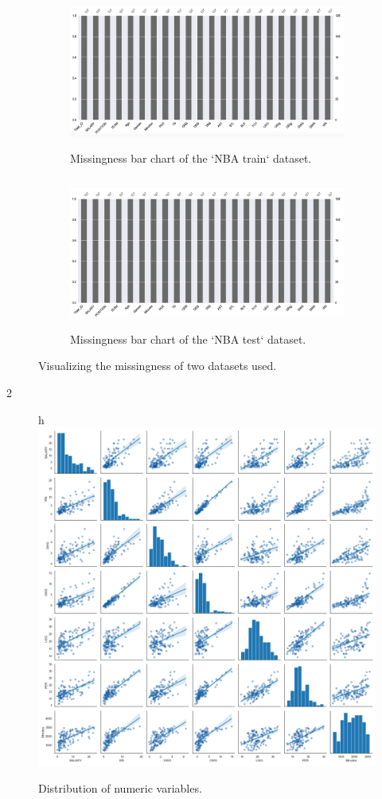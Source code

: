 \documentclass[letterpaper,12pt,twoside,]{pinp}
\begin{document}
\begin{figure}[H]
\begin{subfigure}{0.55\textwidth}
\includegraphics[width=0.9\linewidth, height=5cm]{nbaTrain_miss.png} 
\caption{Missingness bar chart of the `NBA train` dataset.}
\label{fig:trainMiss}
\end{subfigure}
\begin{subfigure}{0.55\textwidth}
\includegraphics[width=0.9\linewidth, height=5cm]{nbaTest_miss.png}
\caption{Missingness bar chart of the `NBA test` dataset.}
\label{fig:testMiss}
\end{subfigure}
\caption{Visualizing the missingness of two datasets used.}
\label{fig:missingness}
\end{figure}

2

\begin{figure}{h}
\includegraphics[width=1\textwidth]{scatter.png}
\centering
\caption{Distribution of numeric variables.}
\label{fig:scatter}
\end{figure}
\end{document}
